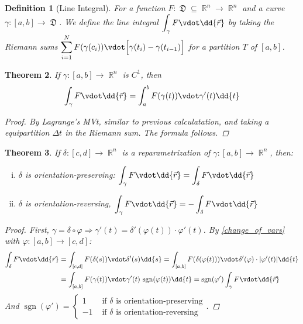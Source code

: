 \documentclass[12pt]{article}
\let\RA\Rightarrow
\DeclareMathOperator{\R}{\mathbb{R}}
\DeclareMathOperator{\D}{\mathfrak{D}}
\newtheorem{theorem}{Theorem}[subsection]
\newtheorem{definition}[theorem]{Definition}
\begin{document}
\begin{definition}[Line Integral]
  For a function $F:\D\subseteq\R^n\to\R^n$ and a curve $\gamma:[a,b]\to\D$. We define the line integral $\displaystyle\int_{\gamma}F\vdot\dd{\vec{r}}$ by taking the Riemann sums $\displaystyle\sum_{i=1}^N F(\gamma(c_i))\vdot\Big[\gamma(t_i)-\gamma(t_{i-1})\Big]$ for a partition $T$ of $[a,b]$.
\end{definition}

\begin{theorem}
  \label{line_integral}
  If $\gamma:[a,b]\to\R^n$ is $C^1$, then $$\int_{\gamma} F\vdot\dd{\vec{r}}=\int_a^b F(\gamma(t))\vdot \gamma'(t)\dd{t}$$
  \begin{proof}
    By Lagrange's MVt, similar to previous calculatation, and taking a equipartition $\Delta t$ in the Riemann sum. The formula follows.
  \end{proof}
\end{theorem}

\begin{theorem}
  If $\delta:[c,d]\to\R^n$ is a reparametrization of $\gamma:[a,b]\to\R^n$, then:
  \begin{enumerate} [(i)]
    \item $\delta$ is orientation-preserving: $\displaystyle\int_{\gamma} F\vdot\dd{\vec{r}}=\int_{\delta} F\vdot\dd{\vec{r}}$
    \item $\delta$ is orientation-reversing, $\displaystyle\int_{\gamma} F\vdot\dd{\vec{r}}=-\int_{\delta} F\vdot\dd{\vec{r}}$
  \end{enumerate}
  \begin{proof}
    First, $\gamma=\delta\circ\varphi\RA \gamma'(t)=\delta'(\varphi(t))\cdot\varphi'(t)$. By \ref{change_of_vars} with $\varphi:[a,b]\to[c,d]$:
    \begin{align*}
      \int_{\delta} F\vdot\dd{\vec{r}}&=\int_{[c,d]} F(\delta(s))\vdot \delta'(s)\dd{s}=\int_{[a,b]} F(\delta(\varphi(t)))\vdot \delta'(\varphi) \cdot|\varphi'(t)|\dd{t}\\
      &=\int_{[a,b]} F(\gamma(t))\vdot \gamma'(t)\,\operatorname{sgn}(\varphi(t))\dd{t}=\operatorname{sgn}(\varphi')\int_{\gamma} F\vdot\dd{\vec{r}}
    \end{align*}
    And $\operatorname{sgn}(\varphi')=\begin{cases}
      1&\text{ if }\delta\text{ is orientation-preserving}\\
      -1&\text{ if }\delta\text{ is orientation-reversing}
    \end{cases}$.
  \end{proof}
\end{theorem}
\end{document}
